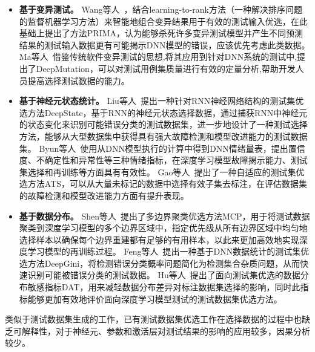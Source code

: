 \begin{itemize}

\item \textbf{基于变异测试。}
Wang等人~，结合learning-to-rank方法（一种解决排序问题的监督机器学习方法）来智能地组合变异结果用于有效的测试输入优选，在此基础上提出了方法PRIMA，认为能够杀死许多变异测试模型并产生不同预测结果的测试输入数据更有可能揭示DNN模型的错误，应该优先考虑此类数据。
Ma等人~借鉴传统软件变异测试的思想,将其应用到针对DNN系统的测试中,提出了DeepMutation，可以对测试用例集质量进行有效的定量分析,帮助开发人员提高选择测试数据的能力。

\item \textbf{基于神经元状态统计。}
Liu等人~提出一种针对RNN神经网络结构的测试集优选方法DeepState，基于RNN的神经元状态选择数据，通过捕获RNN中神经元的状态变化来识别可能错误分类的测试数据集，进一步地设计了一种测试选择方法，能够从大型数据集中获得具有强大故障检测和模型改进能力的测试数据集。
Byun等人~使用从DNN模型执行的计算中得到DNN情绪量表，提出置信度、不确定性和异常性等三种情绪指标，在深度学习模型故障揭示能力、测试集选择和再训练等方面具有有效性。
Gao等人~提出了一种自适应的测试集优选方法ATS，可以从大量未标记的数据中选择有效子集去标注，在评估数据集的故障检测和模型改进能力方面有提升表现。

\item \textbf{基于数据分布。}
Shen等人~提出了多边界聚类优选方法MCP，用于将测试数据聚类到深度学习模型的多个边界区域中，指定优先级从所有边界区域中均匀地选择样本以确保每个边界重建都有足够的有用样本，以此来更加高效地实现深度学习模型的再训练过程。
Feng等人~提出一种基于DNN数据统计的测试集优选方法DeepGini，将检测错误分类概率问题简化为检测集合杂质问题，从而快速识别可能被错误分类的测试数据。
Hu等人~提出了面向测试集优选的数据分布敏感指标DAT，用来减轻数据分布差异对标注数据集选择的影响，同时此指标能够更加有效地评价面向深度学习模型测试的测试数据集优选方法。

\end{itemize}

类似于测试数据集生成的工作，已有测试数据集优选工作在选择数据的过程中也缺乏可解释性，对于神经元、参数和激活层对测试结果的影响的应用较多，因果分析较少。



